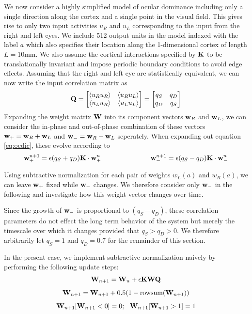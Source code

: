 \documentclass{article}
\begin{document}
We now consider a highly simplified model of ocular dominance including only a single direction along the cortex and a single point in the visual field. This gives rise to only two input activities $u_R$ and $u_L$ corresponding to the input from the right and left eyes. We include 512 output units in the model indexed with the label $a$ which also specifies their location along the 1-dimensional cortex of length $L = 10$mm.
We also assume the cortical interactions specified by $\bf K$ to be translationally invariant and impose periodic boundary conditions to avoid edge effects.
Assuming that the right and left eye are statistically equivalent, we can now write the input correlation matrix as
\[
{\bf Q} = 
\begin{bmatrix}
   \braket{u_R u_R} & \braket{u_R u_L} \\
   \braket{u_L u_R} & \braket{u_L u_L}  \\
\end{bmatrix}
=
\begin{bmatrix}
   q_S &q_D \\
   q_D & q_S  \\
\end{bmatrix}
\]
Expanding the weight matrix $\bf W$ into its component vectors ${\bf w}_R$ and ${\bf w}_L$, we can consider the in-phase and out-of-phase combination of these vectors ${\bf w}_+ = {\bf w}_R + {\bf w}_L $ and ${\bf w}_- = {\bf w}_R - {\bf w}_L $ seperately. When expanding out equation \ref{eq:ocdic}, these evolve according to
\begin{equation}
{\bf w}_{+}^{n+1} = \epsilon (q_S+q_D){\bf K \cdot w}_+^n
~~~~~~~~~~~~~~~~~~~~~~
{\bf w}_{-}^{n+1} = \epsilon (q_S-q_D){\bf K \cdot w}_-^n
\end{equation}

Using subtractive normalization for each pair of weights $w_L(a)$ and $w_R(a)$, we can leave ${\bf w}_+$ fixed while ${\bf w}_-$ changes. We therefore consider only ${\bf w}_-$ in the following and investigate how this weight vector changes over time.

Since the growth of ${\bf w}_-$ is proportional to $(q_S-q_D)$, these correlation parameters do not effect the long term behavior of the system but merely the timescale over which it changes provided that $q_S > q_D > 0$. We therefore arbitrarily let $q_S = 1$ and $q_D = 0.7$ for the remainder of this section. 

In the present case, we implement subtractive normalization naively by performing the following update steps:
\begin{equation}\label{eq:ocdic2}
{\bf W}_{n+1} = {\bf W}_n + \epsilon \bf K W Q
\end{equation}
\begin{equation}
{\bf W}_{n+1} = {\bf W}_{n+1} + 0.5 (1 - \text{rowsum}({\bf W}_{n+1}))
\end{equation}
\begin{equation}\label{eq:subnorm}
{\bf W}_{n+1}[ {\bf W}_{n+1} < 0 ] = 0
;~~
{\bf W}_{n+1}[ {\bf W}_{n+1} > 1 ] = 1
\end{equation}
\end{document}
